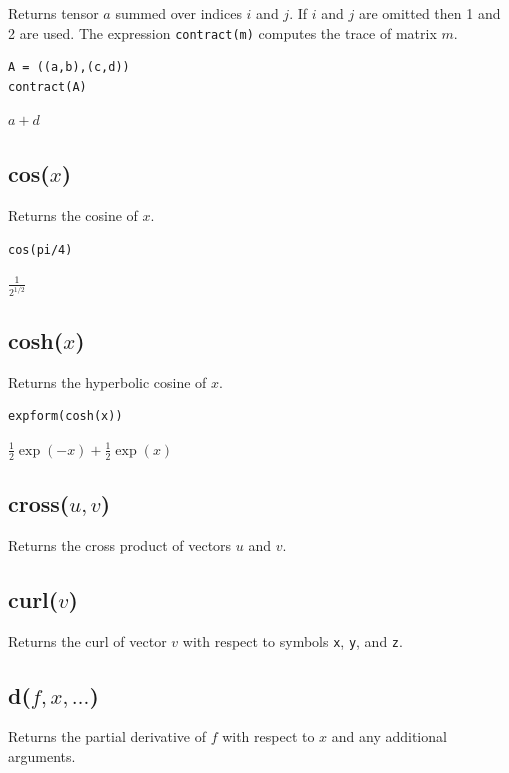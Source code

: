 \documentclass[12pt]{article}
\begin{document}
Returns tensor $a$ summed over indices $i$ and $j$.
If $i$ and $j$ are omitted then 1 and 2 are used.
The expression {\tt contract(m)} computes the trace of matrix $m$.

{\color{blue}
\begin{verbatim}
A = ((a,b),(c,d))
contract(A)
\end{verbatim}
}

$a + d$

\subsection*{cos($x$)}

Returns the cosine of $x$.

{\color{blue}
\begin{verbatim}
cos(pi/4)
\end{verbatim}
}

$\displaystyle \frac{1}{2^{1/2}}$

\subsection*{cosh($x$)}

Returns the hyperbolic cosine of $x$.

{\color{blue}
\begin{verbatim}
expform(cosh(x))
\end{verbatim}
}

$\tfrac{1}{2}\exp(-x)+\tfrac{1}{2}\exp(x)$

\subsection*{cross($u,v$)}

Returns the cross product of vectors $u$ and $v$.

\subsection*{curl($v$)}

Returns the curl of vector $v$ with respect to symbols \verb$x$, \verb$y$, and \verb$z$.

\subsection*{d($f,x,\ldots$)}

Returns the partial derivative of $f$ with respect to $x$ and any additional arguments.
\end{document}

